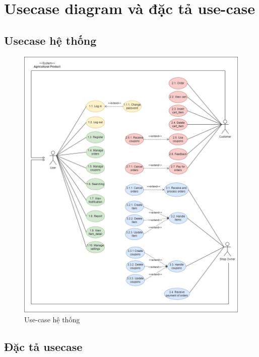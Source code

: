 \section{Usecase diagram và đặc tả use-case}
        \subsection{Usecase hệ thống}
            \begin{figure}[H]
                \centering
                \includegraphics[width=1\linewidth]{Images/usecase.png}
                \vspace{1em}
                \caption{Use-case hệ thống}
            \end{figure}
        \newpage
        \subsection{Đặc tả usecase}
